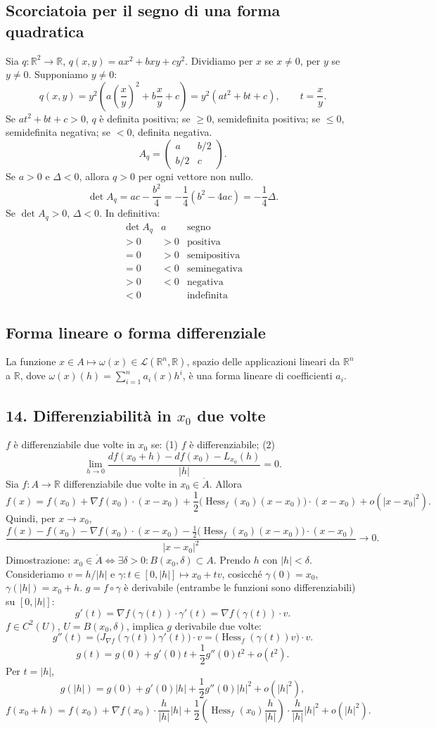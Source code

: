 \documentclass[11pt,a4paper]{article}
\newcommand{\R}{\mathbb R}\newcommand{\N}{\mathbb N}\newcommand{\pagina}[1]{\clearpage}
\begin{document}
\subsection*{Scorciatoia per il segno di una forma quadratica}
Sia $q:\R^2\to\R$, $q(x,y)=ax^2+bxy+cy^2$. Dividiamo per $x$ se $x\ne0$, per $y$ se $y\ne0$. Supponiamo $y\ne0$:
\[q(x,y)=y^2\left(a\left(\frac xy\right)^2+b\frac xy+c\right)=y^2(at^2+bt+c),\qquad t=\frac xy.\]
Se $at^2+bt+c>0$, $q$ è definita positiva; se $\ge0$, semidefinita positiva; se $\le0$, semidefinita negativa; se $<0$, definita negativa.
\pagina{31}
\[A_q=\begin{pmatrix}a&b/2\\b/2&c\end{pmatrix}.\]
Se $a>0$ e $\Delta<0$, allora $q>0$ per ogni vettore non nullo.
\[\det A_q=ac-\frac{b^2}4=-\frac14(b^2-4ac)=-\frac14\Delta.\]
Se $\det A_q>0$, $\Delta<0$. In definitiva:
\[\begin{array}{c|c|l}\det A_q&a&\text{segno}\\\hline>0&>0&\text{positiva}\\=0&>0&\text{semipositiva}\\=0&<0&\text{seminegativa}\\>0&<0&\text{negativa}\\<0&&\text{indefinita}\end{array}\]
\subsection*{Forma lineare o forma differenziale}
La funzione $x\in A\mapsto\omega(x)\in\mathcal L(\R^n,\R)$, spazio delle applicazioni lineari da $\R^n$ a $\R$, dove $\omega(x)(h)=\sum_{i=1}^n a_i(x)h^i$, è una forma lineare di coefficienti $a_i$.
\subsection*{14. Differenziabilità in $x_0$ due volte}
$f$ è differenziabile due volte in $x_0$ se: (1) $f$ è differenziabile; (2)
\[\lim_{h\to0}\frac{df(x_0+h)-df(x_0)-L_{x_0}(h)}{|h|}=0.\]
Sia $f:A\to\R$ differenziabile due volte in $x_0\in\mathring A$. Allora
\[f(x)=f(x_0)+\nabla f(x_0)\cdot(x-x_0)+\frac12\bigl(\operatorname{Hess}_f(x_0)(x-x_0)\bigr)\cdot(x-x_0)+o(|x-x_0|^2).\]
\pagina{32}
Quindi, per $x\to x_0$,
\[\frac{f(x)-f(x_0)-\nabla f(x_0)\cdot(x-x_0)-\frac12\bigl(\operatorname{Hess}_f(x_0)(x-x_0)\bigr)\cdot(x-x_0)}{|x-x_0|^2}\to0.\]
Dimostrazione: $x_0\in\mathring A\iff\exists\delta>0:B(x_0,\delta)\subset A$. Prendo $h$ con $|h|<\delta$. Consideriamo $v=h/|h|$ e $\gamma:t\in[0,|h|]\mapsto x_0+tv$, cosicché $\gamma(0)=x_0$, $\gamma(|h|)=x_0+h$.
$g=f\circ\gamma$ è derivabile (entrambe le funzioni sono differenziabili) su $[0,|h|]$:
\[g'(t)=\nabla f(\gamma(t))\cdot\gamma'(t)=\nabla f(\gamma(t))\cdot v.\]
$f\in C^2(U)$, $U=B(x_0,\delta)$, implica $g$ derivabile due volte:
\[g''(t)=\bigl(J_{\nabla f}(\gamma(t))\gamma'(t)\bigr)\cdot v=\bigl(\operatorname{Hess}_f(\gamma(t))v\bigr)\cdot v.\]
\[g(t)=g(0)+g'(0)t+\frac12g''(0)t^2+o(t^2).\]
Per $t=|h|$,
\[g(|h|)=g(0)+g'(0)|h|+\frac12g''(0)|h|^2+o(|h|^2),\]
\[f(x_0+h)=f(x_0)+\nabla f(x_0)\cdot\frac h{|h|}|h|+\frac12\left(\operatorname{Hess}_f(x_0)\frac h{|h|}\right)\cdot\frac h{|h|}|h|^2+o(|h|^2).\]
\end{document}
